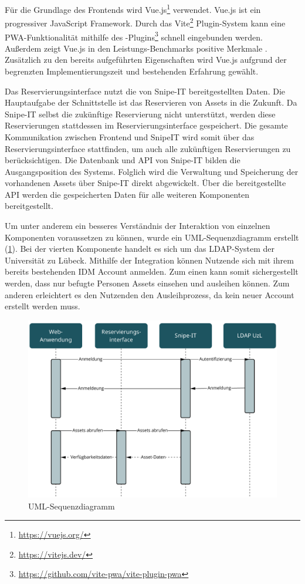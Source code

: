 Für die Grundlage des Frontends wird Vue.js\footnote{\url{https://vuejs.org/}} verwendet. Vue.js ist
ein progressiver JavaScript Framework. Durch das Vite\footnote{\url{https://vitejs.dev/}}
Plugin-System kann eine PWA-Funktionalität mithilfe des
-Plugins\footnote{\url{https://github.com/vite-pwa/vite-plugin-pwa}}
schnell eingebunden werden. Außerdem zeigt Vue.js in den Leistungs-Benchmarks positive Merkmale
. Zusätzlich zu den bereits aufgeführten Eigenschaften wird Vue.js aufgrund
der begrenzten Implementierungszeit und bestehenden Erfahrung gewählt.

Das Reservierungsinterface nutzt die von Snipe-IT bereitgestellten Daten. Die Hauptaufgabe der
Schnittstelle ist das Reservieren von Assets in die Zukunft. Da Snipe-IT selbst die zukünftige
Reservierung nicht unterstützt, werden diese Reservierungen stattdessen im Reservierungsinterface
gespeichert. Die gesamte Kommunikation zwischen Frontend und SnipeIT wird somit über das
Reservierungsinterface stattfinden, um auch alle zukünftigen Reservierungen zu berücksichtigen. Die
Datenbank und API von Snipe-IT bilden die Ausgangsposition des Systems. Folglich wird die Verwaltung
und Speicherung der vorhandenen Assets über Snipe-IT direkt abgewickelt. Über die bereitgestellte
API werden die gespeicherten Daten für alle weiteren Komponenten bereitgestellt. 

Um unter anderem ein besseres Verständnis der Interaktion von einzelnen Komponenten voraussetzen zu können, wurde
ein UML-Sequenzdiagramm erstellt (\ref{fig:uml}). Bei der vierten Komponente handelt es sich um das
LDAP-System der Universität zu Lübeck. Mithilfe der Integration können Nutzende sich mit ihrem bereits
bestehenden IDM Account anmelden. Zum einen kann somit sichergestellt werden, dass nur befugte
Personen Assets einsehen und ausleihen können. Zum anderen erleichtert es den Nutzenden den
Ausleihprozess, da kein neuer Account erstellt werden muss.

\begin{figure}[h]
    \centering
    \includegraphics[scale=0.45]{Bilder/uml.pdf}
    \caption[UML-Sequenzdiagramm]{UML-Sequenzdiagramm}
    \label{fig:uml}
\end{figure}

